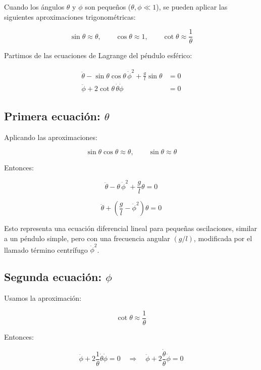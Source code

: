 \documentclass[12pt]{article}
\begin{document}
Cuando los ángulos \( \theta \) y \( \phi \) son pequeños (\( \theta, \phi \ll 1 \)), se pueden aplicar las siguientes aproximaciones trigonométricas:

\[
\sin\theta \approx \theta, \qquad \cos\theta \approx 1, \qquad \cot\theta \approx \frac{1}{\theta}
\]

Partimos de las ecuaciones de Lagrange del péndulo esférico:

\[
\begin{aligned}
\ddot{\theta} - \sin\theta \cos\theta \, \dot{\phi}^2 + \frac{g}{l} \sin\theta &= 0 \\
\ddot{\phi} + 2 \cot\theta \, \dot{\theta} \dot{\phi} &= 0
\end{aligned}
\]

\subsection*{Primera ecuación: \( \theta \)}

Aplicando las aproximaciones:

\[
\sin\theta \cos\theta \approx \theta, \qquad \sin\theta \approx \theta
\]

Entonces:

\[
\ddot{\theta} - \theta \, \dot{\phi}^2 + \frac{g}{l} \theta = 0
\]

\begin{equation}
\boxed{
\ddot{\theta} + \left( \frac{g}{l} - \dot{\phi}^2 \right) \theta = 0
}
\label{Eq11}
\end{equation}

Esto representa una ecuación diferencial lineal para pequeñas oscilaciones, similar a un péndulo simple, pero con una frecuencia angular \((g/l)\), modificada por el llamado término centrífugo \( \dot{\phi}^2 \).

\subsection*{Segunda ecuación: \( \phi \)}

Usamos la aproximación:

\[
\cot\theta \approx \frac{1}{\theta}
\]

Entonces:

\begin{equation}
\ddot{\phi} + 2 \frac{1}{\theta} \dot{\theta} \dot{\phi} = 0
\quad \Rightarrow \quad
\boxed{
\ddot{\phi} + 2 \frac{\dot{\theta}}{\theta} \dot{\phi} = 0
}
\label{Eq12}
\end{equation}
\end{document}
